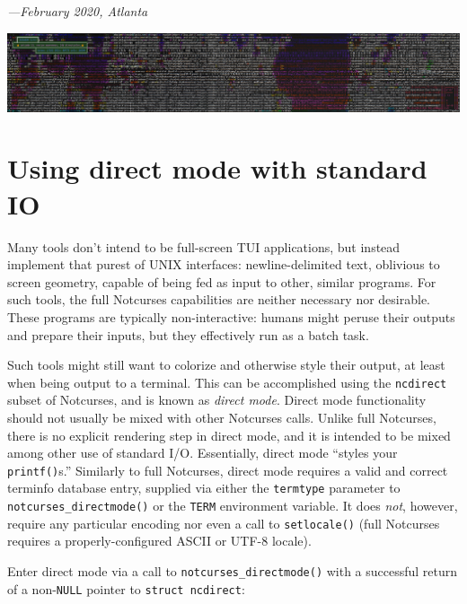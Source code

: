\documentclass[letterpaper,10pt]{article}
\begin{document}
\begin{flushright}
  \textit{---February 2020, Atlanta}
\end{flushright}

\vspace{1in}

\begin{center}
\includegraphics[width=1\linewidth]{media/widechars.png}
\end{center}

\newpage

\section{Using direct mode with standard I\/O}

Many tools don't intend to be full-screen TUI applications, but instead
implement that purest of UNIX interfaces: newline-delimited text, oblivious
to screen geometry, capable of being fed as input to other, similar programs.
For such tools, the full Notcurses capabilities are neither necessary nor
desirable. These programs are typically non-interactive: humans might peruse
their outputs and prepare their inputs, but they effectively run as a batch
task.

 Such tools might still want to colorize and otherwise style their output, at
least when being output to a terminal. This can be accomplished using the
\texttt{ncdirect} subset of Notcurses, and is known as \textit{direct mode}. Direct
mode functionality should not usually be mixed with other Notcurses calls.
Unlike full Notcurses, there is no explicit rendering step in direct mode, and
it is intended to be mixed among other use of standard I/O. Essentially, direct
mode ``styles your \texttt{printf()}s.'' Similarly to full Notcurses, direct mode
requires a valid and correct terminfo database entry, supplied via either the
\texttt{termtype} parameter to \texttt{notcurses\_directmode()} or the \texttt{TERM} environment
variable. It does \textit{not}, however, require any particular encoding nor
even a call to \texttt{setlocale()} (full Notcurses requires a properly-configured
ASCII or UTF-8 locale).

Enter direct mode via a call to \texttt{notcurses\_directmode()} with a successful
return of a non-\texttt{NULL} pointer to \texttt{struct ncdirect}:
\end{document}
